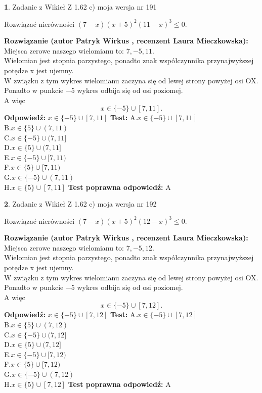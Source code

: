 \documentclass[12pt, a4paper]{article}
\theoremstyle{definition} %
\newtheorem{zad}{}
\newcommand{\zadStart}[1]{\begin{zad}#1\newline}
\newcommand{\zadStop}{\end{zad}}
\newcommand{\rozwStart}[2]{\noindent \textbf{Rozwiązanie (autor #1 , recenzent #2): }\newline}
\newcommand{\rozwStop}{\newline}
\newcommand{\odpStart}{\noindent \textbf{Odpowiedź:}\newline}
\newcommand{\odpStop}{\newline}
\newcommand{\testStart}{\noindent \textbf{Test:}\newline}
\newcommand{\testStop}{\newline}
\newcommand{\kluczStart}{\noindent \textbf{Test poprawna odpowiedź:}\newline}
\newcommand{\kluczStop}{\newline}
\begin{document}
\zadStart{Zadanie z Wikieł Z 1.62 c) moja wersja nr 191}

Rozwiązać nierówności $(7-x)(x+5)^{2}(11-x)^{3}\le0$.
\zadStop
\rozwStart{Patryk Wirkus}{Laura Mieczkowska}
Miejsca zerowe naszego wielomianu to: $7, -5, 11$.\\
Wielomian jest stopnia parzystego, ponadto znak współczynnika przy\linebreak najwyższej potędze x jest ujemny.\\ W związku z tym wykres wielomianu zaczyna się od lewej strony powyżej osi OX.\\
Ponadto w punkcie $-5$ wykres odbija się od osi poziomej.\\
A więc $$x \in \{-5\} \cup [7,11].$$
\rozwStop
\odpStart
$x \in \{-5\} \cup [7,11]$
\odpStop
\testStart
A.$x \in \{-5\} \cup [7,11]$\\
B.$x \in \{5\} \cup (7,11)$\\
C.$x \in \{-5\} \cup (7,11]$\\
D.$x \in \{5\} \cup (7,11]$\\
E.$x \in \{-5\} \cup [7,11)$\\
F.$x \in \{5\} \cup [7,11)$\\
G.$x \in \{-5\} \cup (7,11)$\\
H.$x \in \{5\} \cup [7,11]$
\testStop
\kluczStart
A
\kluczStop



\zadStart{Zadanie z Wikieł Z 1.62 c) moja wersja nr 192}

Rozwiązać nierówności $(7-x)(x+5)^{2}(12-x)^{3}\le0$.
\zadStop
\rozwStart{Patryk Wirkus}{Laura Mieczkowska}
Miejsca zerowe naszego wielomianu to: $7, -5, 12$.\\
Wielomian jest stopnia parzystego, ponadto znak współczynnika przy\linebreak najwyższej potędze x jest ujemny.\\ W związku z tym wykres wielomianu zaczyna się od lewej strony powyżej osi OX.\\
Ponadto w punkcie $-5$ wykres odbija się od osi poziomej.\\
A więc $$x \in \{-5\} \cup [7,12].$$
\rozwStop
\odpStart
$x \in \{-5\} \cup [7,12]$
\odpStop
\testStart
A.$x \in \{-5\} \cup [7,12]$\\
B.$x \in \{5\} \cup (7,12)$\\
C.$x \in \{-5\} \cup (7,12]$\\
D.$x \in \{5\} \cup (7,12]$\\
E.$x \in \{-5\} \cup [7,12)$\\
F.$x \in \{5\} \cup [7,12)$\\
G.$x \in \{-5\} \cup (7,12)$\\
H.$x \in \{5\} \cup [7,12]$
\testStop
\kluczStart
A
\kluczStop
\end{document}
